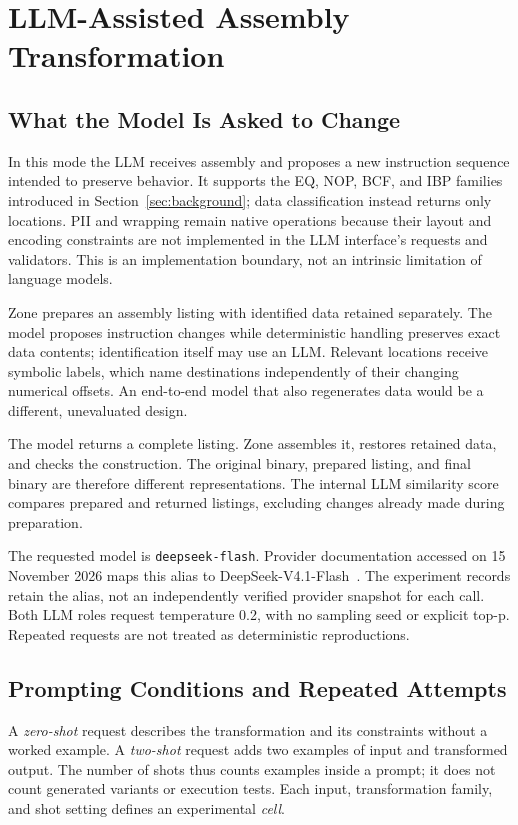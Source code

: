 \section{LLM-Assisted Assembly Transformation}\label{sec:llm}
\subsection{What the Model Is Asked to Change}
In this mode the LLM receives assembly and proposes a new instruction
sequence intended to preserve behavior. It supports the EQ, NOP, BCF,
and IBP families introduced in Section~\ref{sec:background}; data
classification instead returns only locations. PII and wrapping remain
native operations because their layout and encoding constraints are not
implemented in the LLM interface's requests and validators. This is an
implementation boundary, not an intrinsic limitation of language models.

Zone prepares an assembly listing with identified data retained separately.
The model proposes instruction changes while deterministic handling
preserves exact data contents; identification itself may use an LLM.
Relevant locations receive symbolic labels, which name destinations
independently of their changing numerical offsets. An end-to-end model
that also regenerates data would be a different, unevaluated design.

The model returns a complete listing. Zone assembles it, restores retained
data, and checks the construction. The original binary, prepared listing,
and final binary are therefore different representations. The internal
LLM similarity score compares prepared and returned listings, excluding
changes already made during preparation.

The requested model is \texttt{deepseek-flash}. Provider documentation
accessed on 15 November 2026 maps this alias to DeepSeek-V4.1-Flash~\cite{deepseek_models}.
The experiment records retain the alias, not an independently verified
provider snapshot for each call.
Both LLM roles request temperature 0.2, with no sampling seed or explicit
top-p. Repeated requests are not treated as deterministic reproductions.

\subsection{Prompting Conditions and Repeated Attempts}
A \emph{zero-shot} request describes the transformation and its constraints
without a worked example. A \emph{two-shot} request adds two examples of
input and transformed output. The number of shots thus counts examples
inside a prompt; it does not count generated variants or execution tests.
Each input, transformation family, and shot setting defines an experimental
\emph{cell}.

